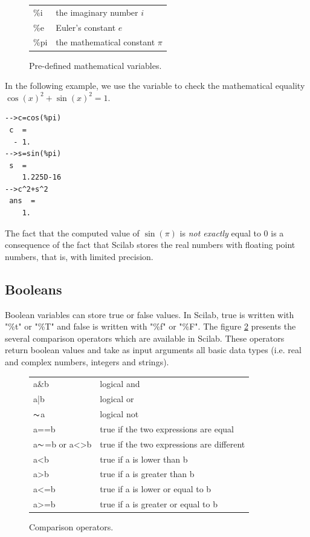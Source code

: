 \begin{figure}
\begin{center}
\begin{tabular}{|ll|}
\hline
\%i & the imaginary number $i$\\
\%e & Euler's constant $e$\\ 
\%pi & the mathematical constant $\pi$\\
\hline
\end{tabular}
\end{center}
\caption{Pre-defined mathematical variables.}
\label{fig-introscilab-glovarmath}
\end{figure}

In the following example, we use the variable
 to check the mathematical equality $\cos(x)^2 + \sin(x)^2 = 1$.
\lstset{language=scilabscript}
\begin{lstlisting}
-->c=cos(%pi)
 c  =
  - 1.  
-->s=sin(%pi)
 s  =
    1.225D-16  
-->c^2+s^2
 ans  =
    1.  
\end{lstlisting}

The fact that the computed value of $\sin(\pi)$ is \emph{not exactly} 
equal to 0 is a consequence of the fact that 
Scilab stores the real numbers with floating point numbers,
that is, with limited precision. 

\subsection{Booleans}

Boolean variables can store true or false values. In Scilab, true is written with 
"\%t" or "\%T" and false is written with "\%f" or "\%F".
The figure \ref{fig-introscilab-compoperators} presents the 
several comparison operators which are available in Scilab.
These operators return boolean values and take as input arguments 
all basic data types (i.e. real and complex numbers, integers and strings).

\begin{figure}
\begin{center}
\begin{tabular}{|ll|}
\hline
a\&b & logical and\\
a|b & logical or\\
$\thicksim$a & logical not\\
a==b & true if the two expressions are equal\\
a$\thicksim$=b or a<>b& true if the two expressions are different\\
a<b & true if a is lower than b\\
a>b & true if a is greater than b\\
a<=b & true if a is lower or equal to b\\
a>=b & true if a is greater or equal to b\\
\hline
\end{tabular}
\end{center}
\caption{Comparison operators.}
\label{fig-introscilab-compoperators}
\end{figure}

